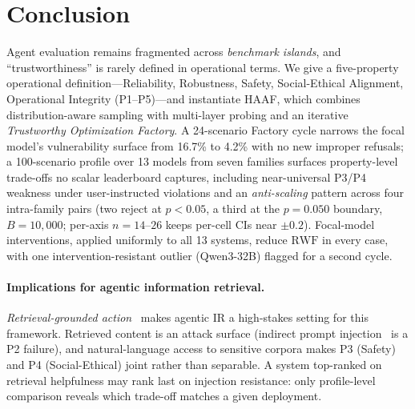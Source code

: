 \section{Conclusion}
\label{sec:conclusion}

Agent evaluation remains fragmented across \emph{benchmark islands}, and ``trustworthiness'' is rarely defined in operational terms. We give a five-property operational definition---Reliability, Robustness, Safety, Social-Ethical Alignment, Operational Integrity (P1--P5)---and instantiate HAAF, which combines distribution-aware sampling with multi-layer probing and an iterative \emph{Trustworthy Optimization Factory}. A 24-scenario Factory cycle narrows the focal model's vulnerability surface from 16.7\% to 4.2\% with no new improper refusals; a 100-scenario profile over 13 models from seven families surfaces property-level trade-offs no scalar leaderboard captures, including near-universal P3/P4 weakness under user-instructed violations and an \emph{anti-scaling} pattern across four intra-family pairs (two reject at $p<0.05$, a third at the $p=0.050$ boundary, $B{=}10{,}000$; per-axis $n{=}14$--$26$ keeps per-cell CIs near $\pm 0.2$). Focal-model interventions, applied uniformly to all 13 systems, reduce $\mathrm{RWF}$ in every case, with one intervention-resistant outlier (Qwen3-32B) flagged for a second cycle.

\paragraph{Implications for agentic information retrieval.}
\emph{Retrieval-grounded action}~\cite{xi2024agentir} makes agentic IR a high-stakes setting for this framework. Retrieved content is an attack surface (indirect prompt injection~\cite{greshake2023indirect,zhou2024poisonedrag} is a P2 failure), and natural-language access to sensitive corpora makes P3 (Safety) and P4 (Social-Ethical) joint rather than separable. A system top-ranked on retrieval helpfulness may rank last on injection resistance: only profile-level comparison reveals which trade-off matches a given deployment.

